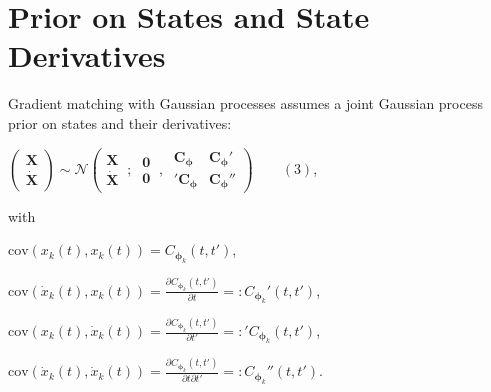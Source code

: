 \section{Prior on States and State Derivatives}

\begin{par}
Gradient matching with Gaussian processes assumes a joint Gaussian process prior on states and their derivatives:
\end{par} \vspace{1em}
\begin{par}
$\left(\begin{array}{c} \mathbf{X} \\ \dot{\mathbf{X}} \end{array}\right) \sim \mathcal{N} \left(\begin{array}{c} \mathbf{X} \\ \dot{\mathbf{X}} \end{array}~;~\begin{array}{c} \mathbf{0} \\\mathbf{0} \end{array}~,~\begin{array}{cc} \mathbf{C}_{\boldsymbol\phi} & \mathbf{C}_{\boldsymbol\phi}' \\ '\mathbf{C}_\boldsymbol{\phi} & \mathbf{C}_{\boldsymbol\phi}'' \end{array} \right) \qquad (3)$,
\end{par} \vspace{1em}
\begin{par}
with
\end{par} \vspace{1em}
\begin{par}
$\mathrm{cov}(x_k(t), x_k(t)) = C_{\boldsymbol\phi_k}(t,t')$,
\end{par} \vspace{1em}
\begin{par}
$\mathrm{cov}(\dot{x}_k(t), x_k(t)) = \frac{\partial C_{\boldsymbol{\phi}_k}(t,t')}{\partial t} =: C_{{\boldsymbol\phi}_k}'(t,t')$,
\end{par} \vspace{1em}
\begin{par}
$\mathrm{cov}(x_k(t), \dot{x}_k(t)) = \frac{\partial C_{\boldsymbol\phi_k}(t,t')}{\partial t'} =: {'C_{\boldsymbol\phi_k}(t,t')}$,
\end{par} \vspace{1em}
\begin{par}
$\mathrm{cov}(\dot{x}_k(t), \dot{x}_k(t)) = \frac{\partial C_{\boldsymbol\phi_k}(t,t') }{\partial t \partial t'} =: C_{\boldsymbol\phi_k}''(t,t')$.
\end{par}


